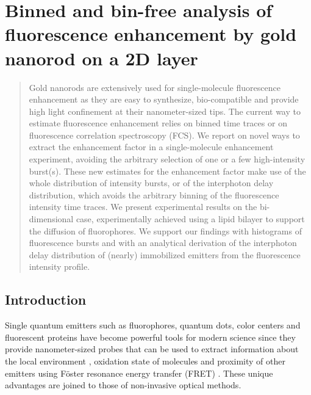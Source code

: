 \chapter{Binned and bin-free analysis of fluorescence enhancement by gold nanorod on a 2D layer}
\label{chapter:binfree}
\graphicspath{{./chapters/c3_binfree/figures/}}

\begin{abstract}
Gold nanorods are extensively used for single-molecule fluorescence enhancement as they are easy to synthesize, bio-compatible and provide high light confinement at their nanometer-sized tips. The current way to estimate fluorescence enhancement relies on binned time traces or on fluorescence correlation spectroscopy (FCS). We report on novel ways to extract the enhancement factor in a single-molecule enhancement experiment, avoiding the arbitrary selection of one or a few high-intensity burst(s). These new estimates for the enhancement factor make use of the whole distribution of intensity bursts, or of the interphoton delay distribution, which avoids the arbitrary binning of the fluorescence intensity time traces. We present experimental results on the bi-dimensional case, experimentally achieved using a lipid bilayer to support the diffusion of fluorophores.  We support our findings with histograms of fluorescence bursts and with an analytical derivation of the interphoton delay distribution of (nearly) immobilized emitters from the fluorescence intensity profile.
\end{abstract}
\newpage
\section{Introduction}
Single quantum emitters such as fluorophores, quantum dots, color centers 
and fluorescent proteins have become powerful tools for modern science 
since they provide nanometer-sized probes that can be used to extract 
information about the local environment \cite{moerner1999illuminating, kulzer2010single}, 
oxidation state of molecules \cite{zhang2017gold} and proximity of other 
emitters using F\"oster resonance energy transfer (FRET) \cite{jares2003fret,stein2011single,kalinin2012toolkit}. 
These unique advantages are joined to those of non-invasive optical methods. 

